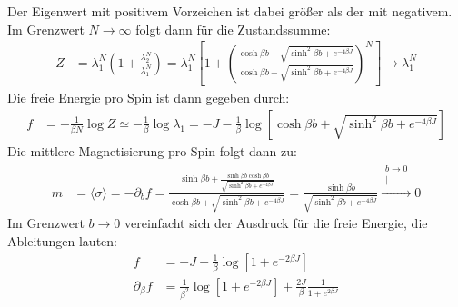 \documentclass[a4paper,12pt]{article}
\newcommand{\bra}{}
\newcommand{\kom}{}
\newcommand{\kla}{}
\newcommand{\klam}{}
\begin{document}
Der Eigenwert mit positivem Vorzeichen ist dabei größer als der mit negativem. Im Grenzwert $N\rightarrow\infty $ folgt dann für die Zustandssumme:
\begin{align*}
Z&=\lambda_1^N\kla\left( {1+\frac{\lambda_2^N}{\lambda_1^N}} \right)=\lambda_1^N\klam\left[ {1+\kla\left( {\frac{\cosh\beta b -\sqrt{\sinh^2\beta b+e^{-4\beta J}}}{\cosh\beta b +\sqrt{\sinh^2\beta b+e^{-4\beta J}}}} \right)^N} \right]\longrightarrow\lambda_1^N
\end{align*}
Die freie Energie pro Spin ist dann gegeben durch:
\begin{align*}
f&=-\frac{1}{\beta N}\log Z\simeq -\frac{1}{\beta}\log\lambda_1=-J -\frac{1}{\beta}\log\klam\left[ {\cosh\beta b+\sqrt{\sinh^2\beta b+e^{-4\beta J}}} \right]
\end{align*}
Die mittlere Magnetisierung pro Spin folgt dann zu:
\begin{align*}
m&=\bra\langle {\sigma}\rangle=-\partial_bf=\frac{\sinh\beta b+\frac{\sinh\beta b\cosh\beta b}{\sqrt{\sinh^2\beta b+e^{-4\beta J}}}}{\cosh\beta b+\sqrt{\sinh^2\beta b+e^{-4\beta J}}}=\frac{\sinh\beta b}{\sqrt{\sinh^2\beta b+e^{-4\beta J}}}\kom\overset{\substack{{b\rightarrow 0} \\ |}}{\longrightarrow}0
\end{align*}
Im Grenzwert $b\rightarrow 0$ vereinfacht sich der Ausdruck für die freie Energie, die Ableitungen lauten:
\begin{align*}
f&=-J-\frac{1}{\beta}\log\klam\left[ {1+e^{-2\beta J}} \right]\\
\partial_\beta f&=\frac{1}{\beta^2}\log\klam\left[ {1+e^{-2\beta J}} \right]+\frac{2J}{\beta}\frac{1}{1+e^{2\beta J}}
\end{align*}
\end{document}
